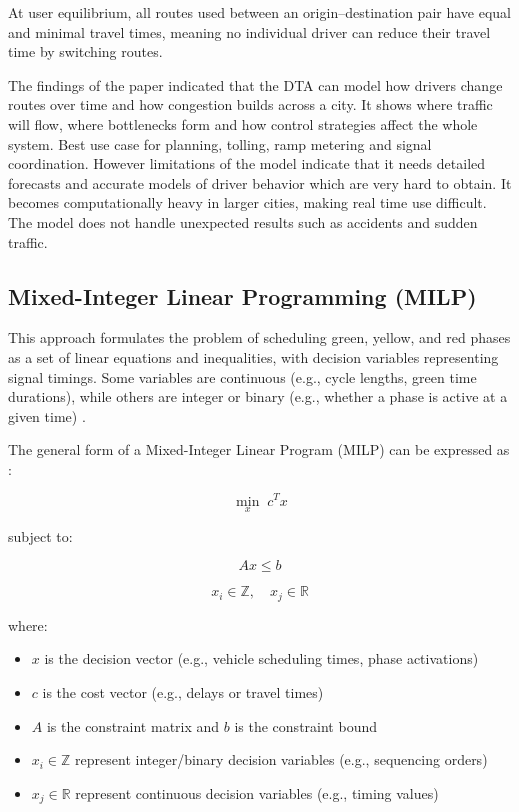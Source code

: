 \documentclass[11pt, a4paper]{report}
\begin{document}
At user equilibrium, all routes used between an origin--destination pair have equal and minimal travel times, meaning no individual driver can reduce their travel time by switching routes.

The findings of the paper \cite{elimadi2024review} indicated that the DTA can model how drivers change routes over time and how congestion builds across a city. It shows where traffic will flow, where bottlenecks form and how control strategies affect the whole system. Best use case for planning, tolling, ramp metering and signal coordination. However limitations of the model indicate that it needs detailed forecasts and accurate models of driver behavior which are very hard to obtain. It becomes computationally heavy in larger cities, making real time use difficult. The model does not handle unexpected results such as accidents and sudden traffic.

\subsection{Mixed-Integer Linear Programming (MILP)}

This approach formulates the problem of scheduling green, yellow, and red phases as a set of linear equations and inequalities, with decision variables representing signal timings. Some variables are continuous (e.g., cycle lengths, green time durations), while others are integer or binary (e.g., whether a phase is active at a given time) \cite{guilliard2016nonhomogeneous}.

The general form of a Mixed-Integer Linear Program (MILP) can be expressed as \cite{ye2019survey}:

\begin{equation}
\min_{x} \; c^T x
\label{eq:milp-objective}
\end{equation}

subject to:

\begin{equation}
Ax \leq b
\label{eq:milp-constraint1}
\end{equation}

\begin{equation}
x_i \in \mathbb{Z}, \quad x_j \in \mathbb{R}
\label{eq:milp-constraint2}
\end{equation}

where:

\begin{itemize}
    \item $x$ is the decision vector (e.g., vehicle scheduling times, phase activations)
    \item $c$ is the cost vector (e.g., delays or travel times)
    \item $A$ is the constraint matrix and $b$ is the constraint bound
    \item $x_i \in \mathbb{Z}$ represent integer/binary decision variables (e.g., sequencing orders)
    \item $x_j \in \mathbb{R}$ represent continuous decision variables (e.g., timing values)
\end{itemize}
\end{document}

